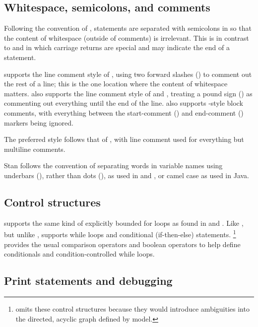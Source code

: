 \documentclass[article]{jss}
\begin{document}
\subsection{Whitespace, semicolons, and comments}

Following the convention of , statements are separated
with semicolons in  so that the content of whitespace
(outside of comments) is irrelevant.  This is in contrast to
 and  in which carriage returns are
special and may indicate the end of a statement.

 supports the line comment style of ,
using two forward slashes (\code{//}) to comment out the rest of a
line; this is the one location where the content of whitespace
matters.   also supports the line comment style of  and
, treating a pound sign (\code{\#}) as commenting out
everything until the end of the line.   also supports
-style block comments, with everything between the
start-comment (\code{/*}) and end-comment (\code{*/}) markers being
ignored. 

The preferred style follows that of , with line comment
used for everything but multiline comments.  

Stan follows the  convention of separating words in
variable names using underbars (\code{\_}), rather than dots
(), as used in  and , or camel case
as used in Java.

\subsection{Control structures}

 supports the same kind of explicitly bounded for loops
as found in  and .  Like , but unlike
,  supports while loops and conditional
(if-then-else) statements.%
%
\footnote{ omits these control structures because they
  would introduce ambiguities into the directed, acyclic graph defined
  by model.}
%
 provides the usual comparison operators and boolean
operators to help define conditionals and condition-controlled while
loops.  

\subsection{Print statements and debugging}
\end{document}
